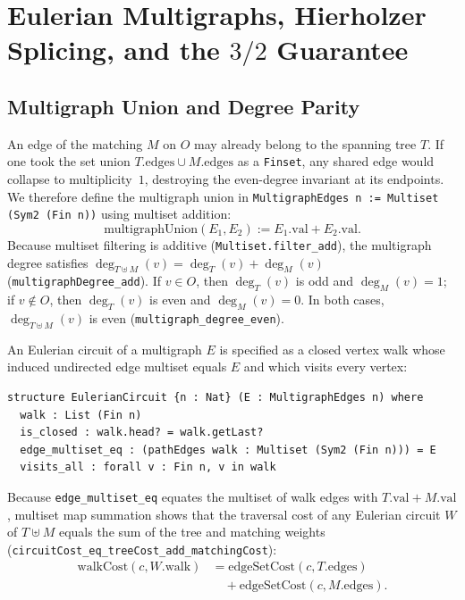 \section{Eulerian Multigraphs, Hierholzer Splicing, and the \texorpdfstring{$3/2$}{3/2} Guarantee}
\label{sec:eulerian}

\subsection{Multigraph Union and Degree Parity}

An edge of the matching $M$ on $O$ may already belong to the spanning tree $T$. If one took the set union $T.\mathrm{edges} \cup M.\mathrm{edges}$ as a \texttt{Finset}, any shared edge would collapse to multiplicity~$1$, destroying the even-degree invariant at its endpoints. We therefore define the multigraph union in \texttt{MultigraphEdges n := Multiset (Sym2 (Fin n))} using multiset addition:
\begin{equation}
  \mathrm{multigraphUnion}(E_1, E_2) := E_1.\mathrm{val} + E_2.\mathrm{val}.
\end{equation}
Because multiset filtering is additive (\texttt{Multiset.filter\_add}), the multigraph degree satisfies $\deg_{T \uplus M}(v) = \deg_T(v) + \deg_M(v)$ (\texttt{multigraphDegree\_add}). If $v \in O$, then $\deg_T(v)$ is odd and $\deg_M(v) = 1$; if $v \notin O$, then $\deg_T(v)$ is even and $\deg_M(v) = 0$. In both cases, $\deg_{T \uplus M}(v)$ is even (\texttt{multigraph\_degree\_even}).

An Eulerian circuit of a multigraph $E$ is specified as a closed vertex walk whose induced undirected edge multiset equals $E$ and which visits every vertex:

\noindent\begin{minipage}{\linewidth}
\begin{lstlisting}[language=lean4]
structure EulerianCircuit {n : Nat} (E : MultigraphEdges n) where
  walk : List (Fin n)
  is_closed : walk.head? = walk.getLast?
  edge_multiset_eq : (pathEdges walk : Multiset (Sym2 (Fin n))) = E
  visits_all : forall v : Fin n, v in walk
\end{lstlisting}
\end{minipage}
Because \texttt{edge\_multiset\_eq} equates the multiset of walk edges with $T.\mathrm{val} + M.\mathrm{val}$, multiset map summation shows that the traversal cost of any Eulerian circuit $W$ of $T \uplus M$ equals the sum of the tree and matching weights (\texttt{circuitCost\_eq\_treeCost\_add\_matchingCost}):
\begin{equation}
\begin{aligned}
  \mathrm{walkCost}(c, W.\mathrm{walk})
  &= \mathrm{edgeSetCost}(c, T.\mathrm{edges}) \\
  &\quad + \mathrm{edgeSetCost}(c, M.\mathrm{edges}).
\end{aligned}
\end{equation}


